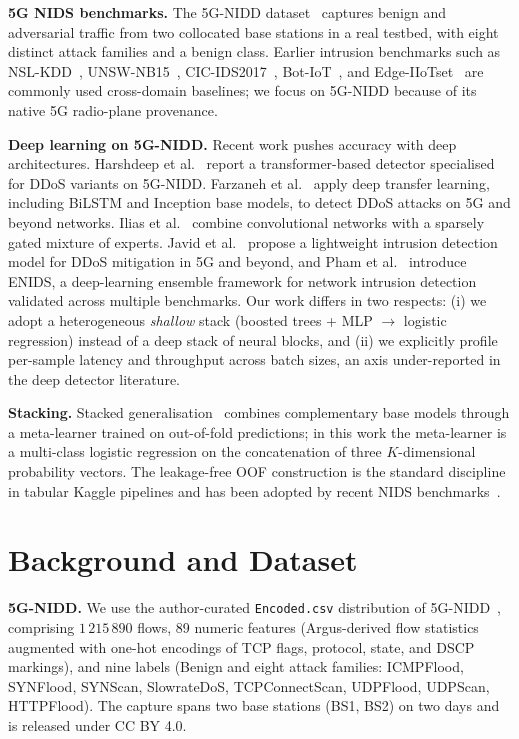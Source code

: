 \documentclass[conference]{IEEEtran}
\begin{document}
\textbf{5G NIDS benchmarks.} The 5G-NIDD dataset~\cite{samarakoon2022_5gnidd}
captures benign and adversarial traffic from two collocated base stations
in a real testbed, with eight distinct attack families and a benign
class. Earlier intrusion benchmarks such as NSL-KDD~\cite{hettich1999_kddcup99},
UNSW-NB15~\cite{moustafa2015_unswnb15}, CIC-IDS2017~\cite{sharafaldin2018_cicids2017},
Bot-IoT~\cite{koroniotis2019_bot_iot}, and Edge-IIoTset~\cite{ferrag2022_edgeiiotset}
are commonly used cross-domain baselines; we focus on 5G-NIDD because of
its native 5G radio-plane provenance.

\textbf{Deep learning on 5G-NIDD.} Recent work pushes accuracy with deep
architectures. Harshdeep et al.~\cite{harshdeep2025_deeptransids} report
a transformer-based detector specialised for DDoS variants on 5G-NIDD.
Farzaneh et al.~\cite{farzaneh2024_dtl5g} apply deep transfer learning,
including BiLSTM and Inception base models, to detect DDoS attacks on
5G and beyond networks. Ilias et al.~\cite{ilias2025_cnn_moe} combine
convolutional networks with a sparsely gated mixture of experts. Javid
et al.~\cite{javid2025_nidd_lightweight} propose a lightweight intrusion
detection model for DDoS mitigation in 5G and beyond, and Pham et
al.~\cite{enids_2024} introduce ENIDS, a deep-learning ensemble framework
for network intrusion detection validated across multiple benchmarks.
Our work differs in two
respects: (i) we adopt a heterogeneous \emph{shallow} stack (boosted
trees + MLP $\rightarrow$ logistic regression) instead of a deep stack
of neural blocks, and (ii) we explicitly profile per-sample latency and
throughput across batch sizes, an axis under-reported in the deep
detector literature.

\textbf{Stacking.} Stacked generalisation~\cite{wolpert1992_stacked,
breiman1996_stacked_reg} combines complementary base models through a
meta-learner trained on out-of-fold predictions; in this work the
meta-learner is a multi-class logistic regression on the concatenation
of three $K$-dimensional probability vectors. The leakage-free OOF
construction is the standard discipline in tabular Kaggle pipelines and
has been adopted by recent NIDS benchmarks~\cite{kunang2024_lightweight_edge}.

\section{Background and Dataset}
\label{sec:background}

\textbf{5G-NIDD.} We use the author-curated \texttt{Encoded.csv}
distribution of 5G-NIDD~\cite{siriwardhana2025_5gnidd_iddd}, comprising
$1\,215\,890$ flows, 89 numeric features (Argus-derived flow statistics
augmented with one-hot encodings of TCP flags, protocol, state, and DSCP
markings), and nine labels (Benign and eight attack families:
ICMPFlood, SYNFlood, SYNScan, SlowrateDoS, TCPConnectScan, UDPFlood,
UDPScan, HTTPFlood). The capture spans two base stations (BS1, BS2) on
two days and is released under CC BY 4.0.
\end{document}
